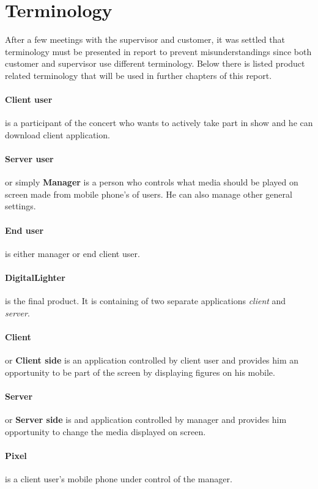 \section {Terminology}
\label{sec:terminology}
After a few meetings with the supervisor and customer, it was settled that terminology must be presented in report to prevent misunderstandings since both customer and supervisor use different terminology.
Below there is listed product related terminology that will be used in further chapters of this report.

\paragraph{Client user}
is a participant of the concert who wants to actively take part in show and he can download client application.

\paragraph{Server user}
or simply \textbf{Manager} is a person who controls what media should be played on screen made from mobile phone's of users. 
He can also manage other general settings.

\paragraph{End user} is either manager or end client user.

\paragraph{DigitalLighter}
is the final product. It is containing of two separate applications \emph{client} and \emph{server}.


\paragraph{Client} or \textbf{Client side} is an application controlled by client user and provides him an opportunity to be part of the screen by displaying figures on his mobile.

\paragraph{Server} or \textbf{Server side} is and application controlled by manager and provides him opportunity to change the media displayed on screen.

\paragraph{Pixel} is a client user's mobile phone under control of the manager.

